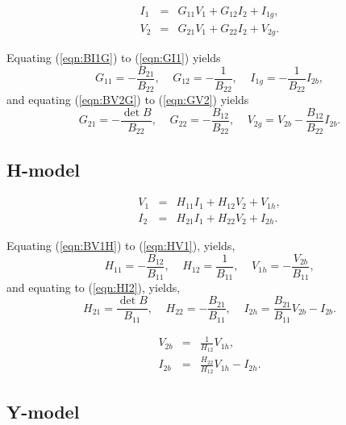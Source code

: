 \documentclass[a4paper, 12pt]{article}
\newcommand{\bigspace}{\;\;\;\;}
\newcommand{\refeqn}[1]{\mbox{(\ref{eqn:#1})}}
\begin{document}
\begin{eqnarray}
\label{eqn:GI1}
  I_1 & = & G_{11} V_1 + G_{12} I_2 + I_{1g}, \\
  V_2 & = & G_{21} V_1 + G_{22} I_2 + V_{2g}.
\label{eqn:GV2}
\end{eqnarray}


Equating \refeqn{BI1G} to \refeqn{GI1} yields
%
\begin{equation}
 G_{11} = - \frac{B_{21}}{B_{22}}, \bigspace G_{12} = -\frac{1}{B_{22}}, \bigspace I_{1g} = -\frac{1}{B_{22}} I_{2b},
\end{equation}
%
and equating \refeqn{BV2G} to \refeqn{GV2} yields
%
\begin{equation}
  G_{21} = -\frac{\det{B}}{B_{22}}, \bigspace G_{22} = -\frac{B_{12}}{B_{22}}, \bigspace V_{2g} = V_{2b} - \frac{B_{12}}{B_{22}} I_{2b}.
\end{equation}


\subsection{H-model}

\begin{eqnarray}
\label{eqn:HV1}
  V_1 & = & H_{11} I_1 + H_{12} V_2 + V_{1h}, \\
  I_2 & = & H_{21} I_1 + H_{22} V_2 + I_{2h}.
\label{eqn:HI2}
\end{eqnarray}


Equating \refeqn{BV1H} to \refeqn{HV1}, yields,
%
\begin{equation}
  H_{11} = -\frac{B_{12}}{B_{11}}, \bigspace H_{12} = \frac{1}{B_{11}}, \bigspace V_{1h} = -\frac{V_{2b}}{B_{11}},
\end{equation}
%
and equating to \refeqn{HI2}, yields,
%
\begin{equation}
  H_{21} = \frac{\det{B}}{B_{11}}, \bigspace H_{22} = -\frac{B_{21}}{B_{11}}, \bigspace I_{2h} = \frac{B_{21}}{B_{11}} V_{2b} - I_{2b}.
\end{equation}


\begin{eqnarray}
  V_{2b} & = & \frac{1}{H_{12}} V_{1h}, \\
  I_{2b} & = & \frac{H_{22}}{H_{12}} V_{1h} - I_{2h}.
\end{eqnarray}




\subsection{Y-model}
\end{document}
